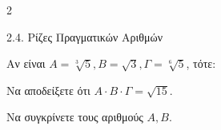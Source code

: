 \begin{ylh}{2}
    \item 2.4. Ρίζες Πραγματικών Αριθμών
\end{ylh}
Αν είναι $A = \sqrt[3]{5}, B = \sqrt{3}, \Gamma = \sqrt[6]{5}$, τότε:
\begin{alist}
\item Να αποδείξετε ότι $A \cdot B \cdot \Gamma = \sqrt{15}$. 
\item Να συγκρίνετε τους αριθμούς $A, B$. 
\end{alist}

